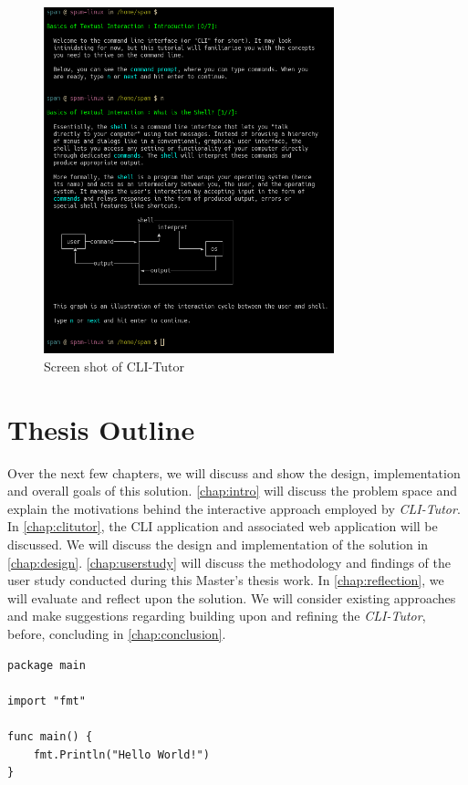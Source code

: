 \begin{figure}[H]
	\centering
	\includegraphics[width=0.75\textwidth]{img/clitutor}
	\caption{Screen shot of CLI-Tutor}
	\label{fig:clitutor}
\end{figure}

\section{Thesis Outline}

Over the next few chapters, we will discuss and show the design, implementation
and overall goals of this solution. \autoref{chap:intro} will discuss the
problem space and explain the motivations behind the interactive approach
employed by \textit{CLI-Tutor}. In \autoref{chap:clitutor}, the CLI application
and associated web application will be discussed. We will discuss the design
and implementation of the solution in \autoref{chap:design}.
\autoref{chap:userstudy} will discuss the methodology and findings of the user
study conducted during this Master's thesis work. In \autoref{chap:reflection},
we will evaluate and reflect upon the solution. We will consider existing
approaches and make suggestions regarding building upon and refining the
\textit{CLI-Tutor}, before, concluding in \autoref{chap:conclusion}.


\begin{lstlisting}[caption=spam]
package main

import "fmt"

func main() {
    fmt.Println("Hello World!")
}
\end{lstlisting}
